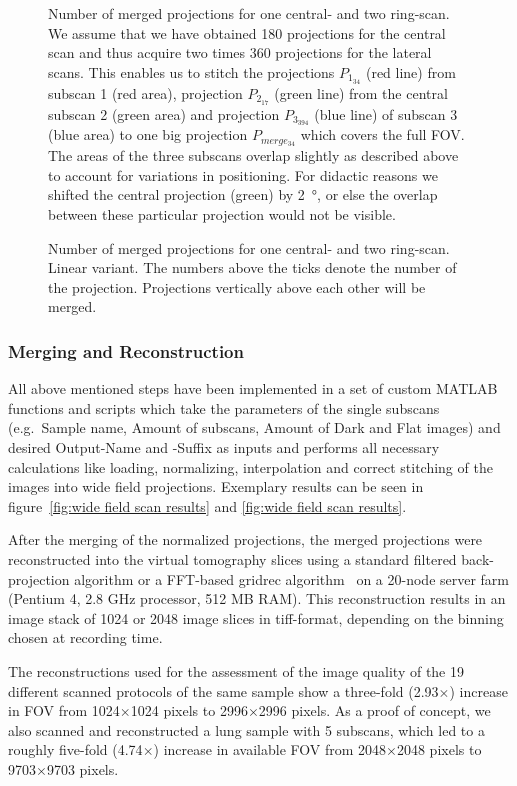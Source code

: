 \begin{figure}
	\centering
	\caption{Number of merged projections for one central- and two ring-scan. We assume that we have obtained 180 projections for the central scan and thus acquire two times 360 projections for the lateral scans. This enables us to stitch the projections $P_{1_{34}}$ (red line) from subscan 1 (red area), projection $P_{2_{17}}$ (green line) from the central subscan 2 (green area) and projection $P_{3_{394}}$ (blue line) of subscan 3 (blue area) to one big projection $P_{merge_{34}}$ which covers the full FOV. The areas of the three subscans overlap slightly as described above to account for variations in positioning. For didactic reasons we shifted the central projection (green) by \SI{2}{\degree}, or else the overlap between these particular projection would not be visible.}%
	\label{fig:amount of projections}%
\end{figure}

\begin{figure}
	\centering
	\caption{Number of merged projections for one central- and two ring-scan. Linear variant. The numbers above the ticks denote the number of the projection. Projections vertically above each other will be merged.}%
	\label{fig:amount of projections - linear}%
\end{figure}

\subsubsection{Merging and Reconstruction}
All above mentioned steps have been implemented in a set of custom MATLAB\textsuperscript{\textregistered} functions and scripts which take the parameters of the single subscans (e.g.\ Sample name, Amount of subscans, Amount of Dark and Flat images) and desired Output-Name and -Suffix as inputs and performs all necessary calculations like loading, normalizing, interpolation and correct stitching of the images into wide field projections. Exemplary results can be seen in figure~\ref{fig:wide field scan results} and \ref{fig:wide field scan results}.

After the merging of the normalized projections, the merged projections were reconstructed into the virtual tomography slices using a standard filtered back-projection algorithm or a FFT-based gridrec algorithm~\cite{Dowd1999} on a 20-node server farm (Pentium 4, 2.8 GHz processor, 512 MB RAM). This reconstruction results in an image stack of 1024 or 2048 image slices in tiff-format, depending on the binning chosen at recording time. 

The reconstructions used for the assessment of the image quality of the 19 different scanned protocols of the same sample show a three-fold (2.93$\times$) increase in FOV from 1024$\times$1024 pixels to 2996$\times$2996 pixels. As a proof of concept, we also scanned and reconstructed a lung sample with 5 subscans, which led to a roughly five-fold (4.74$\times$) increase in available FOV from 2048$\times$2048 pixels to 9703$\times$9703 pixels.